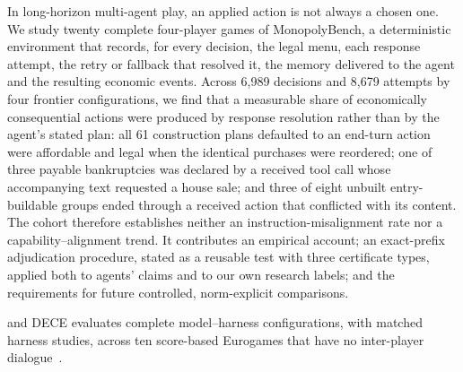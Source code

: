 
In long-horizon multi-agent play, an applied action is not always a chosen one. We study twenty complete four-player games of MonopolyBench, a deterministic environment that records, for every decision, the legal menu, each response attempt, the retry or fallback that resolved it, the memory delivered to the agent and the resulting economic events. Across 6,989 decisions and 8,679 attempts by four frontier configurations, we find that a measurable share of economically consequential actions were produced by response resolution rather than by the agent's stated plan: all 61 construction plans defaulted to an end-turn action were affordable and legal when the identical purchases were reordered; one of three payable bankruptcies was declared by a received tool call whose accompanying text requested a house sale; and three of eight unbuilt entry-buildable groups ended through a received action that conflicted with its content.
The cohort therefore establishes neither an instruction-misalignment rate nor a capability--alignment trend. It contributes an empirical account; an exact-prefix adjudication procedure, stated as a reusable test with three certificate types, applied both to agents' claims and to our own research labels; and the requirements for future controlled, norm-explicit comparisons.

and DECE evaluates complete model--harness configurations, with matched harness studies, across ten score-based Eurogames that have no inter-player dialogue~\cite{wu2026agentmonopoly,hu2026finboardbench,zhang2026dece}.

